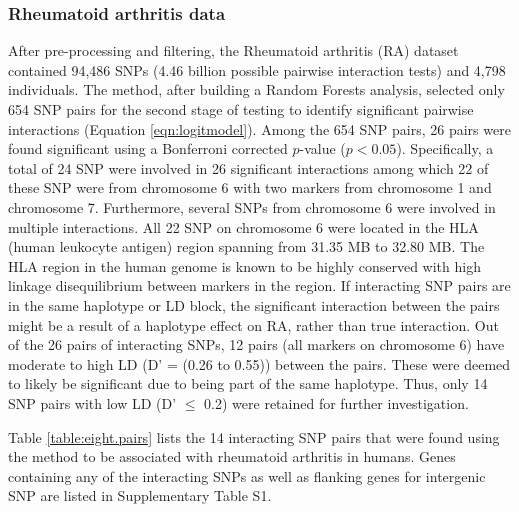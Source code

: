 \documentclass[preprint,12pt,3p]{elsarticle}
\begin{document}
\subsubsection{Rheumatoid arthritis data}
After pre-processing and filtering, the Rheumatoid arthritis (RA) dataset contained 94,486 SNPs (4.46 billion possible
pairwise interaction tests) and 4,798 individuals. The method, after building a Random Forests analysis, selected only
654 SNP pairs for the second stage of testing to identify significant pairwise interactions (Equation \ref{eqn:logitmodel}). Among the
654 SNP pairs, 26 pairs were found significant using a Bonferroni corrected $p$-value ($p < 0.05$). Specifically, a total of
24 SNP were involved in 26 significant interactions among which 22 of these SNP were from chromosome 6 with two
markers from chromosome 1 and chromosome 7. Furthermore, several SNPs from chromosome 6 were involved in multiple
interactions. All 22 SNP on chromosome 6 were located in the HLA (human leukocyte antigen) region spanning from 31.35 MB
to 32.80 MB. The HLA region in the human genome is known to be highly conserved with high linkage disequilibrium
between markers in the region. If interacting SNP pairs are in the same haplotype or LD block, the significant
interaction between the pairs might be a result of a haplotype effect on RA, rather than true interaction. Out of the 26
pairs of interacting SNPs, 12 pairs (all markers on chromosome 6) have moderate to high LD (D' = (0.26 to 0.55)) between
the pairs.  These were deemed to likely be significant due to being part of the same haplotype. Thus, only 14 SNP pairs
with low LD (D' $\leq$ 0.2) were retained for further investigation.

Table \ref{table:eight.pairs} lists the 14 interacting SNP pairs that were found using the method to be associated with rheumatoid arthritis
in humans.  Genes containing any of the interacting SNPs as well as flanking genes for intergenic SNP are listed in
Supplementary Table S1.
\end{document}
